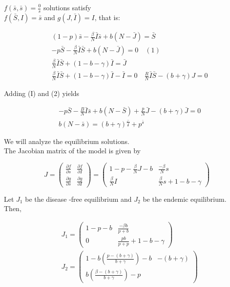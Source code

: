 \documentclass[10pt]{article}
\begin{document}
$f(\bar{s}, \bar{s})=\frac{0}{s}$ solutions satisfy\\
$f(\bar{S}, I)=\bar{s}$ and $g(J, \bar{I})=I$, that is:


\begin{align*}
& (1-p) \bar{s}-\frac{\beta}{N} \bar{I} \bar{s}+b(N-\bar{J})=\bar{S} \\
& -p \bar{S}-\frac{\beta}{N} \bar{I} \bar{S}+b(N-\bar{J})=0 \quad(1)  \tag{1}\\
& \frac{\beta}{N} \bar{I} \bar{S}+(1-b-\gamma) \bar{I}=\bar{J} \\
& \frac{\beta}{N} \bar{I} \bar{S}+(1-b-\gamma) \bar{I}-\bar{I}=0 \quad \frac{R}{N} \bar{I} \bar{S}-(b+\gamma) J=0
\end{align*}


Adding (I) and (2) yields


\begin{align*}
& -p \bar{S}-\frac{B}{N} \bar{I} \bar{s}+b(N-\bar{S})+\frac{p}{N} \bar{J}-(b+\gamma) \bar{J}=0 \\
& b(N-\bar{s})=(b+\gamma) \overline{7}+p^{\bar{s}} \tag{3}
\end{align*}


We will analyze the equilibrium solutions.\\
The Jacobian matrix of the model is given by

$$
J=\left(\begin{array}{ll}
\frac{\partial f}{\partial s} & \frac{\partial f}{\partial I} \\
\frac{\partial g}{\partial s} & \frac{\partial g}{\partial I}
\end{array}\right)=\left(\begin{array}{ll}
1-p-\frac{\beta}{N} J-b & \frac{-\beta}{N} s \\
\frac{\beta}{N} I & \frac{\beta}{N} s+1-b-\gamma
\end{array}\right)
$$

Let $J_{1}$ be the disease -free equilibrium and $J_{2}$ be the endemic equilibrium.\\
Then,

$$
\begin{aligned}
& J_{1}=\left(\begin{array}{cc}
1-p-b & \frac{-\beta b}{p+b} \\
0 & \frac{p b}{p+p}+1-b-\gamma
\end{array}\right) \\
& J_{2}=\left(\begin{array}{cc}
1-b\left(\frac{p-(b+\gamma)}{b+\gamma}\right)-b & -(b+\gamma) \\
b\left(\frac{\beta-(b+\gamma)}{b+\gamma}\right)-p
\end{array}\right)
\end{aligned}
$$
\end{document}
